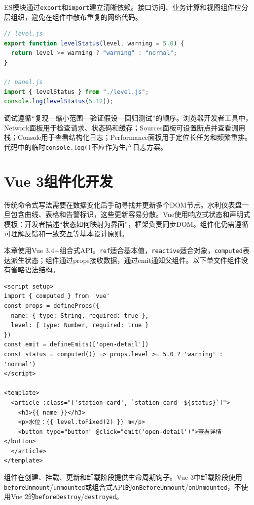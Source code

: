 ES模块通过\texttt{export}和\texttt{import}建立清晰依赖。接口访问、业务计算和视图组件应分层组织，避免在组件中散布重复的网络代码。

\begin{lstlisting}[language=JavaScript]
// level.js
export function levelStatus(level, warning = 5.0) {
  return level >= warning ? "warning" : "normal";
}

// panel.js
import { levelStatus } from "./level.js";
console.log(levelStatus(5.12));
\end{lstlisting}

调试遵循“复现—缩小范围—验证假设—回归测试”的顺序。浏览器开发者工具中，Network面板用于检查请求、状态码和缓存；Sources面板可设置断点并查看调用栈；Console用于查看结构化日志；Performance面板用于定位长任务和频繁重排。代码中的临时\texttt{console.log()}不应作为生产日志方案。

\section{Vue 3组件化开发}

传统命令式写法需要在数据变化后手动寻找并更新多个DOM节点。水利仪表盘一旦包含曲线、表格和告警标识，这些更新容易分散。Vue使用响应式状态和声明式模板：开发者描述“状态如何映射为界面”，框架负责同步DOM。组件化仍需遵循可理解反馈和一致交互等基本设计原则\cite{norman2013}。

本章使用Vue 3.4+组合式API。\texttt{ref}适合基本值，\texttt{reactive}适合对象，\texttt{computed}表达派生状态；组件通过props接收数据，通过emit通知父组件。以下单文件组件没有省略语法结构。

\begin{lstlisting}[language=Vue]
<script setup>
import { computed } from 'vue'
const props = defineProps({
  name: { type: String, required: true },
  level: { type: Number, required: true }
})
const emit = defineEmits(['open-detail'])
const status = computed(() => props.level >= 5.0 ? 'warning' : 'normal')
</script>

<template>
  <article :class="['station-card', `station-card--${status}`]">
    <h3>{{ name }}</h3>
    <p>水位：{{ level.toFixed(2) }} m</p>
    <button type="button" @click="emit('open-detail')">查看详情</button>
  </article>
</template>
\end{lstlisting}

组件在创建、挂载、更新和卸载阶段提供生命周期钩子。Vue 3中卸载阶段使用\texttt{beforeUnmount}/\texttt{unmounted}或组合式API的\texttt{onBeforeUnmount}/\texttt{onUnmounted}，不使用Vue 2的\texttt{beforeDestroy}/\texttt{destroyed}。

